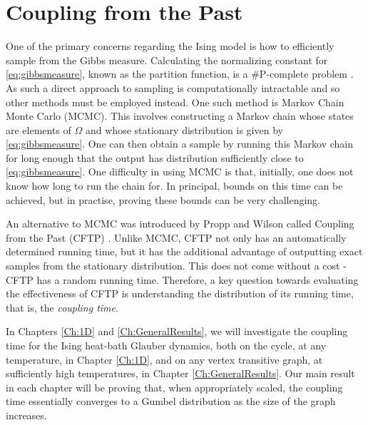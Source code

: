 

\section{Coupling from the Past}
	One of the primary concerns regarding the Ising model is how to efficiently sample from the Gibbs measure. Calculating the normalizing constant for \eqref{eq:gibbsmeasure}, known as the partition function, is a \#P-complete problem \cite{Jerrum1993-ii}. As such a direct approach to sampling is computationally intractable and so other methods must be employed instead. One such method is Markov Chain Monte Carlo (MCMC). This involves constructing a Markov chain whose states are elements of $\Omega$ and whose stationary distribution is given by \eqref{eq:gibbsmeasure}. One can then obtain a sample by running this Markov chain for long enough that the output has distribution sufficiently close to \eqref{eq:gibbsmeasure}.
	One difficulty in using MCMC is that, initially, one does not know how long to run the chain for. In principal, bounds on this time can be achieved, but in practise, proving these bounds can be very challenging.

	An alternative to MCMC was introduced by Propp and Wilson called Coupling from the Past (CFTP) \cite{Propp1996-cf}. Unlike MCMC, CFTP not only has an automatically determined running time, but it has the additional advantage of outputting exact samples from the stationary distribution. This does not come without a cost - CFTP has a random running time. Therefore, a key question towards evaluating the effectiveness of CFTP is understanding the distribution of its running time, that is, the \emph{coupling time}.

	In Chapters \ref{Ch:1D} and \ref{Ch:GeneralResults}, we will investigate the coupling time for the Ising heat-bath Glauber dynamics, both on the cycle, at any temperature, in Chapter \ref{Ch:1D}, and on any vertex transitive graph, at sufficiently high temperatures, in Chapter \ref{Ch:GeneralResults}. Our main result in each chapter will be proving that, when appropriately scaled, the coupling time essentially converges to a Gumbel distribution as the size of the graph increases. 

